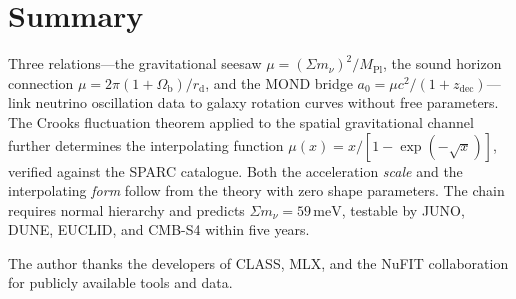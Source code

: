 \documentclass[prl,twocolumn,superscriptaddress,longbibliography]{revtex4-2}
\newcommand{\meV}{\,\mathrm{meV}}
\newcommand{\zdec}{z_{\mathrm{dec}}}
\newcommand{\rd}{r_{\mathrm{d}}}
\newcommand{\Ob}{\Omega_{\mathrm{b}}}
\newcommand{\MPl}{M_{\mathrm{Pl}}}
\newcommand{\azero}{a_0}
\newcommand{\sumnu}{\Sigma m_\nu}
\begin{document}
\section{Summary}

Three relations---the gravitational seesaw
$\mu = (\sumnu)^2/\MPl$,
the sound horizon connection $\mu = 2\pi(1+\Ob)/\rd$,
and the MOND bridge $\azero = \mu c^2/(1+\zdec)$---link
neutrino oscillation data to galaxy rotation curves
without free parameters.
The Crooks fluctuation theorem applied to the spatial
gravitational channel further determines the interpolating
function $\mu(x) = x/[1-\exp(-\sqrt{x})]$, verified against
the SPARC catalogue.
Both the acceleration \textit{scale} and the interpolating
\textit{form} follow from the theory with zero shape parameters.
The chain requires normal hierarchy and predicts
$\sumnu = 59\meV$, testable by JUNO, DUNE, EUCLID, and CMB-S4
within five years.

\begin{acknowledgments}
The author thanks the developers of CLASS, MLX, and the
NuFIT collaboration for publicly available tools and data.
\end{acknowledgments}
\end{document}
